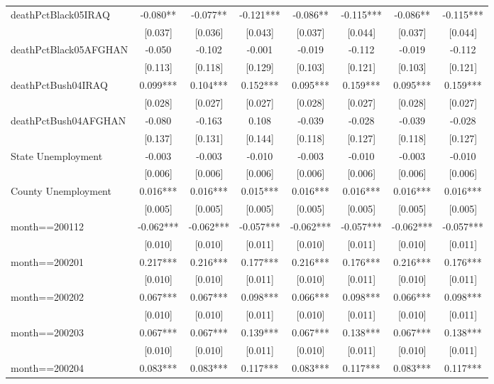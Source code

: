\documentclass[]{article}
\begin{document}
\begin{tabular}{lccccccc}
deathPctBlack05IRAQ & -0.080** & -0.077** & -0.121*** & -0.086** & -0.115*** & -0.086** & -0.115*** \\
 & [0.037] & [0.036] & [0.043] & [0.037] & [0.044] & [0.037] & [0.044] \\
deathPctBlack05AFGHAN & -0.050 & -0.102 & -0.001 & -0.019 & -0.112 & -0.019 & -0.112 \\
 & [0.113] & [0.118] & [0.129] & [0.103] & [0.121] & [0.103] & [0.121] \\
deathPctBush04IRAQ & 0.099*** & 0.104*** & 0.152*** & 0.095*** & 0.159*** & 0.095*** & 0.159*** \\
 & [0.028] & [0.027] & [0.027] & [0.028] & [0.027] & [0.028] & [0.027] \\
deathPctBush04AFGHAN & -0.080 & -0.163 & 0.108 & -0.039 & -0.028 & -0.039 & -0.028 \\
 & [0.137] & [0.131] & [0.144] & [0.118] & [0.127] & [0.118] & [0.127] \\
State Unemployment & -0.003 & -0.003 & -0.010 & -0.003 & -0.010 & -0.003 & -0.010 \\
 & [0.006] & [0.006] & [0.006] & [0.006] & [0.006] & [0.006] & [0.006] \\
County Unemployment & 0.016*** & 0.016*** & 0.015*** & 0.016*** & 0.016*** & 0.016*** & 0.016*** \\
 & [0.005] & [0.005] & [0.005] & [0.005] & [0.005] & [0.005] & [0.005] \\
month==200112 & -0.062*** & -0.062*** & -0.057*** & -0.062*** & -0.057*** & -0.062*** & -0.057*** \\
 & [0.010] & [0.010] & [0.011] & [0.010] & [0.011] & [0.010] & [0.011] \\
month==200201 & 0.217*** & 0.216*** & 0.177*** & 0.216*** & 0.176*** & 0.216*** & 0.176*** \\
 & [0.010] & [0.010] & [0.011] & [0.010] & [0.011] & [0.010] & [0.011] \\
month==200202 & 0.067*** & 0.067*** & 0.098*** & 0.066*** & 0.098*** & 0.066*** & 0.098*** \\
 & [0.010] & [0.010] & [0.011] & [0.010] & [0.011] & [0.010] & [0.011] \\
month==200203 & 0.067*** & 0.067*** & 0.139*** & 0.067*** & 0.138*** & 0.067*** & 0.138*** \\
 & [0.010] & [0.010] & [0.011] & [0.010] & [0.011] & [0.010] & [0.011] \\
month==200204 & 0.083*** & 0.083*** & 0.117*** & 0.083*** & 0.117*** & 0.083*** & 0.117*** \\

\end{tabular}
\end{document}

